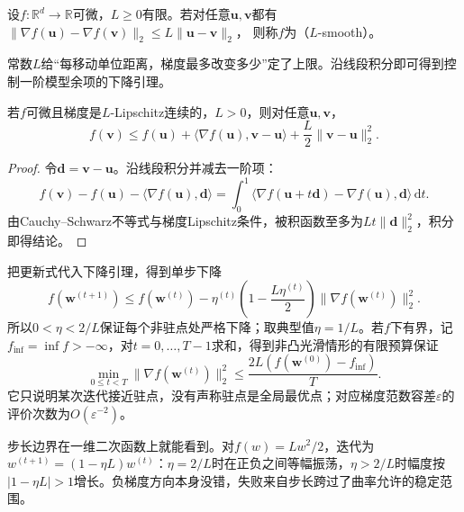 \begin{definition}[欧氏梯度光滑性]
\label{def:opt-smoothness}
设$f:\mathbb R^d\to\mathbb R$可微，$L\geq0$有限。若对任意$\bm u,\bm v$都有
$\lVert\nabla f(\bm{u})-\nabla f(\bm{v})\rVert_2
\leq L\lVert\bm{u}-\bm{v}\rVert_2$，
则称$f$为（$L$-smooth）。
\end{definition}

常数$L$给“每移动单位距离，梯度最多改变多少”定了上限。沿线段积分即可得到控制一阶模型余项的下降引理。

\begin{lemma}[下降引理]
\label{lem:opt-descent}
若$f$可微且梯度是$L$-Lipschitz连续的，$L>0$，则对任意$\bm u,\bm v$，
\begin{equation}
  f(\bm{v})\leq f(\bm{u})
  +\langle\nabla f(\bm{u}),\bm{v}-\bm{u}\rangle
  +\frac{L}{2}\lVert\bm{v}-\bm{u}\rVert_2^2.
  \label{eq:opt-descent-lemma}
\end{equation}
\end{lemma}

\begin{proof}
令$\bm d=\bm v-\bm u$。沿线段积分并减去一阶项：
\[
  f(\bm v)-f(\bm u)-\langle\nabla f(\bm u),\bm d\rangle
  =\int_0^1\langle\nabla f(\bm u+t\bm d)-\nabla f(\bm u),\bm d\rangle\,\mathrm dt.
\]
由Cauchy--Schwarz不等式与梯度Lipschitz条件，被积函数至多为$Lt\|\bm d\|_2^2$，积分即得结论。
\end{proof}

把更新式代入下降引理，得到单步下降
\begin{equation}
  f(\bm{w}^{(t+1)})
  \leq f(\bm{w}^{(t)})
  -\eta^{(t)}\left(1-\frac{L\eta^{(t)}}2\right)
  \lVert\nabla f(\bm{w}^{(t)})\rVert_2^2.
  \label{eq:opt-gradient-single-step}
\end{equation}
所以$0<\eta<2/L$保证每个非驻点处严格下降；取典型值$\eta=1/L$。若$f$下有界，记$f_{\inf}=\inf f>-\infty$，对$t=0,\ldots,T-1$求和，得到非凸光滑情形的有限预算保证
\begin{equation}
  \min_{0\leq t<T}\lVert\nabla f(\bm{w}^{(t)})\rVert_2^2
  \leq
  \frac{2L(f(\bm{w}^{(0)})-f_{\inf})}{T}.
  \label{eq:opt-nonconvex-gradient-rate}
\end{equation}
它只说明某次迭代接近驻点，没有声称驻点是全局最优点；对应梯度范数容差$\varepsilon$的评价次数为$O(\varepsilon^{-2})$。

步长边界在一维二次函数上就能看到。对$f(w)=Lw^2/2$，迭代为$w^{(t+1)}=(1-\eta L)w^{(t)}$：$\eta=2/L$时在正负之间等幅振荡，$\eta>2/L$时幅度按$|1-\eta L|>1$增长。负梯度方向本身没错，失败来自步长跨过了曲率允许的稳定范围。

